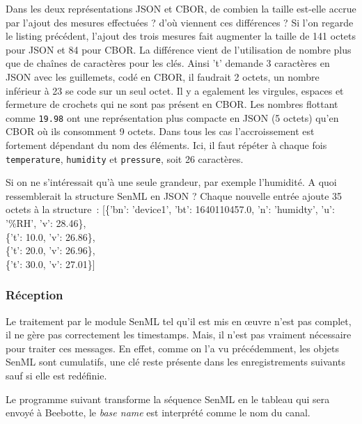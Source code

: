  {Dans les deux représentations JSON et CBOR, de combien la taille est-elle accrue par l'ajout des mesures effectuées ? d'où viennent ces différences ?}
 {
 Si l'on regarde le listing précédent, l'ajout des trois mesures fait augmenter la taille de 141 octets pour JSON et 84 pour CBOR. La différence vient de l'utilisation de nombre plus que de chaînes de caractères pour les clés. Ainsi 't' demande 3 caractères en JSON avec les guillemets, codé en CBOR, il faudrait 2 octets, un nombre inférieur à 23 se code sur un seul octet. Il y a egalement les virgules, espaces et fermeture de crochets qui ne sont pas présent en CBOR. Les nombres flottant comme \texttt{19.98} ont une représentation plus compacte en JSON (5 octets) qu'en CBOR où ils consomment 9 octets. Dans tous les cas l'accroissement est fortement dépendant du nom des éléments. Ici, il faut répéter à chaque fois \texttt{temperature}, \texttt{humidity} et \texttt{pressure}, soit 26 caractères.
 }
 
 {Si on ne s'intéressait qu'à une seule grandeur, par exemple l'humidité. A quoi ressemblerait la structure SenML en JSON ?}
 {
 Chaque nouvelle entrée ajoute 35 octets à la structure~: 
 [\{'bn': 'device1',  'bt': 1640110457.0, 'n': 'humidty', 'u': '\%RH', 'v': 28.46\},\\
 \{'t': 10.0, 'v': 26.86\},\\
 \{'t': 20.0, 'v': 26.96\},\\
 \{'t': 30.0, 'v': 27.01\}]\\
 }
 
 \subsubsection{Réception}
 
 Le traitement par le module SenML tel qu'il est mis en œuvre n'est pas complet, il ne gère pas correctement les timestamps. Mais, il n'est pas vraiment nécessaire pour traiter ces messages. En effet, comme on l'a vu précédemment, les objets SenML sont cumulatifs, une clé reste présente dans les enregistrements suivants sauf si elle est redéfinie. 
 
 Le programme suivant transforme la séquence SenML en le tableau qui sera envoyé à Beebotte, le \textit{base name} est interprété comme le nom du canal.